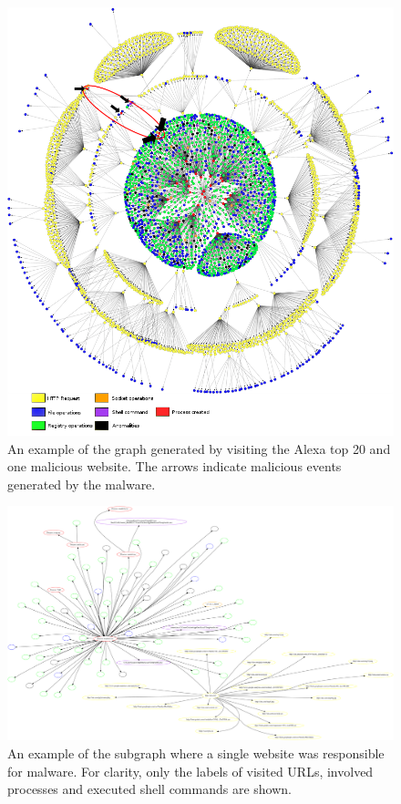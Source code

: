 \pagebreak

\begin{figure}[h]
    \centering
    \centerline{\includegraphics[width=20cm]{Images/graph4.jpg}}
    \caption{An example of the graph generated by visiting the Alexa top 20 and one malicious website. The arrows indicate malicious events generated by the malware.}
    \label{fig:graph}
\end{figure}

\pagebreak

\begin{figure}[h]
    \centering
    \includegraphics[width=25cm, angle=90]{Images/report_Subprocess_from_tab}
    \caption{An example of the subgraph where a single website was responsible for malware. For clarity, only the labels of visited URLs, involved processes and executed shell commands are shown.}
    \label{fig:subgraph}
\end{figure}

